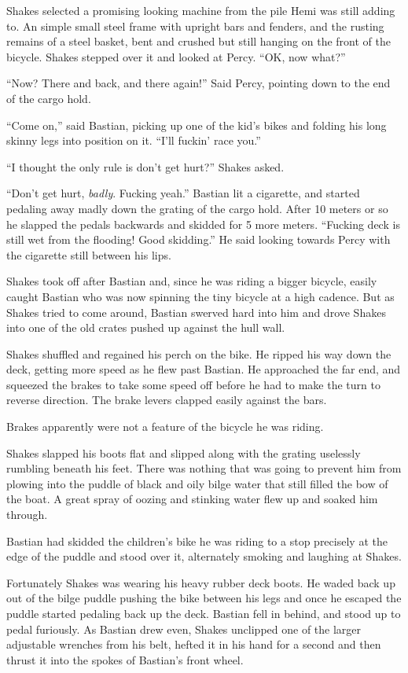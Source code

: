 \documentclass[]{scrbook}
\begin{document}
Shakes selected a promising looking machine from the pile Hemi was still
adding to. An simple small steel frame with upright bars and fenders,
and the rusting remains of a steel basket, bent and crushed but still
hanging on the front of the bicycle. Shakes stepped over it and looked
at Percy. ``OK, now what?''

``Now? There and back, and there again!'' Said Percy, pointing down to
the end of the cargo hold.

``Come on,'' said Bastian, picking up one of the kid's bikes and folding
his long skinny legs into position on it. ``I'll fuckin' race you.''

``I thought the only rule is don't get hurt?'' Shakes asked.

``Don't get hurt, \emph{badly}. Fucking yeah.'' Bastian lit a cigarette,
and started pedaling away madly down the grating of the cargo hold.
After 10 meters or so he slapped the pedals backwards and skidded for 5
more meters. ``Fucking deck is still wet from the flooding! Good
skidding.'' He said looking towards Percy with the cigarette still
between his lips.

Shakes took off after Bastian and, since he was riding a bigger bicycle,
easily caught Bastian who was now spinning the tiny bicycle at a high
cadence. But as Shakes tried to come around, Bastian swerved hard into
him and drove Shakes into one of the old crates pushed up against the
hull wall.

Shakes shuffled and regained his perch on the bike. He ripped his way
down the deck, getting more speed as he flew past Bastian. He approached
the far end, and squeezed the brakes to take some speed off before he
had to make the turn to reverse direction. The brake levers clapped
easily against the bars.

Brakes apparently were not a feature of the bicycle he was riding.

Shakes slapped his boots flat and slipped along with the grating
uselessly rumbling beneath his feet. There was nothing that was going to
prevent him from plowing into the puddle of black and oily bilge water
that still filled the bow of the boat. A great spray of oozing and
stinking water flew up and soaked him through.

Bastian had skidded the children's bike he was riding to a stop
precisely at the edge of the puddle and stood over it, alternately
smoking and laughing at Shakes.

Fortunately Shakes was wearing his heavy rubber deck boots. He waded
back up out of the bilge puddle pushing the bike between his legs and
once he escaped the puddle started pedaling back up the deck. Bastian
fell in behind, and stood up to pedal furiously. As Bastian drew even,
Shakes unclipped one of the larger adjustable wrenches from his belt,
hefted it in his hand for a second and then thrust it into the spokes of
Bastian's front wheel.
\end{document}
